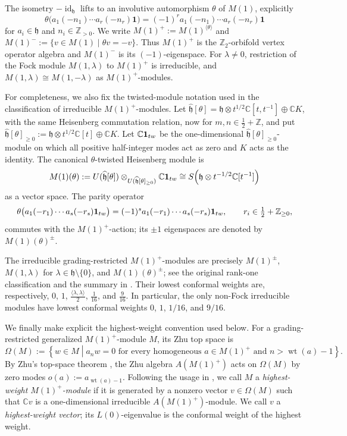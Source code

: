\documentclass[10pt,a4paper]{amsart}
\numberwithin{equation}{section} \newtheorem{thm}{Theorem}[section] \newtheorem{lem}[thm]{Lemma} \newtheorem{ex}[thm]{Example} \newtheorem{prop}[thm]{Proposition} \newtheorem{cor}[thm]{Corollary} \newtheorem{defi}[thm]{Definition} \newtheorem{rmk}[thm]{Remark} \newtheorem{notation}[thm]{Notation}
\newcommand{\one}{\mathbf{1}}
\newcommand{\id}{\operatorname{id}}
\newcommand{\wt}{\operatorname{wt}}
\def\Z{\mathbb{Z}} \def\N{\mathbb{N}} \def\A{\mathbb{A}} \def\C{\mathbb{C}} \def\R{\mathbb{R}} \def\Q{\mathbb{Q}} \def\F{\mathbb{F}}
\begin{document}
The isometry $-\id_{\mathfrak h}$ lifts to an involutive automorphism $\theta$ of $M(1)$, explicitly
\[
\theta\bigl(a_1(-n_1)\cdots a_r(-n_r)\one\bigr)=(-1)^r a_1(-n_1)\cdots a_r(-n_r)\one
\]
for $a_i\in\mathfrak h$ and $n_i\in\Z_{>0}$. We write \(M(1)^+:=M(1)^{\langle\theta\rangle}\) and \(M(1)^-:=\{v\in M(1)\mid\theta v=-v\}\). Thus $M(1)^+$ is the $\mathbb Z_2$-orbifold vertex operator algebra and $M(1)^-$ is its $(-1)$-eigenspace. For $\lambda\ne0$, restriction of the Fock module $M(1,\lambda)$ to $M(1)^+$ is irreducible, and $M(1,\lambda)\cong M(1,-\lambda)$ as $M(1)^+$-modules.

For completeness, we also fix the twisted-module notation used in the classification of irreducible $M(1)^+$-modules. Let \(\widehat{\mathfrak h}[\theta]=\mathfrak h\otimes t^{1/2}\C[t,t^{-1}]\oplus\C K\), with the same Heisenberg commutation relation, now for $m,n\in\frac12+\Z$, and put $\widehat{\mathfrak h}[\theta]_{\ge0} :=\mathfrak h\otimes t^{1/2}\C[t]\oplus\C K$. Let $\C\one_{\rm tw}$ be the one-dimensional $\widehat{\mathfrak h}[\theta]_{\ge0}$-module on which all positive half-integer modes act as zero and $K$ acts as the identity. The canonical $\theta$-twisted Heisenberg module is
\[
M(1)(\theta)
:=
U(\widehat{\mathfrak h}[\theta])
\otimes_{U(\widehat{\mathfrak h}[\theta]_{\ge0})}
\C\one_{\rm tw}
\cong
S\!\left(\mathfrak h\otimes t^{-1/2}\C[t^{-1}]\right)
\]
as a vector space. The parity operator
\[
\theta\bigl(a_1(-r_1)\cdots a_s(-r_s)\one_{\rm tw}\bigr)
=
(-1)^s a_1(-r_1)\cdots a_s(-r_s)\one_{\rm tw},
\qquad r_i\in\tfrac12+\Z_{\ge0},
\]
commutes with the $M(1)^+$-action; its $\pm1$ eigenspaces are denoted by $M(1)(\theta)^\pm$.

The irreducible grading-restricted $M(1)^+$-modules are precisely \(M(1)^\pm\), \(M(1,\lambda)\) for \(\lambda\in\mathfrak h\setminus\{0\}\), and \(M(1)(\theta)^\pm\); see the original rank-one classification \cite{DongNagatomo} and the summary in \cite[Section~2.1]{ALY}. Their lowest conformal weights are, respectively, \(0\), \(1\), \(\frac{\langle\lambda,\lambda\rangle}{2}\), \(\frac1{16}\), and \(\frac9{16}\). In particular, the only non-Fock irreducible modules have lowest conformal weights $0$, $1$, $1/16$, and $9/16$.

We finally make explicit the highest-weight convention used below. For a grading-restricted generalized $M(1)^+$-module $M$, its Zhu top space is
\[
\Omega(M):=\left\{w\in M\middle|a_nw=0\text{ for every homogeneous }a\in M(1)^+\text{ and }n>\wt(a)-1\right\}.
\] By Zhu's top-space theorem \cite{Zhu}, the Zhu algebra $A(M(1)^+)$ acts on $\Omega(M)$ by zero modes $o(a):=a_{\wt(a)-1}$. Following the usage in \cite[Section~3.4]{ALY}, we call $M$ a \emph{highest-weight $M(1)^+$-module} if it is generated by a nonzero vector $v\in\Omega(M)$ such that $\C v$ is a one-dimensional irreducible $A(M(1)^+)$-module. We call $v$ a \emph{highest-weight vector}; its $L(0)$-eigenvalue is the conformal weight of the highest weight.
\end{document}

